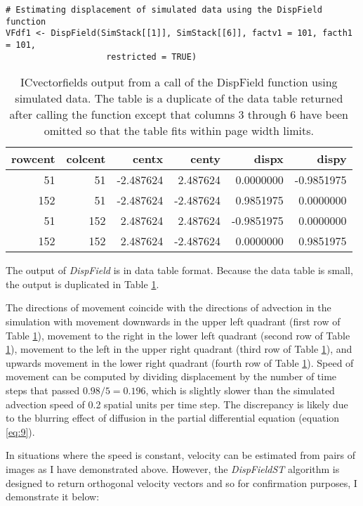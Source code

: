 \begin{verbatim}
# Estimating displacement of simulated data using the DispField function
VFdf1 <- DispField(SimStack[[1]], SimStack[[6]], factv1 = 101, facth1 = 101, 
                    restricted = TRUE)
\end{verbatim}

\begin{table}

\caption{\label{tab:DispField-output-tex}ICvectorfields output from a call of the DispField function using simulated data. The table is a duplicate of the data table returned after calling the function except that columns 3 through 6 have been omitted so that the table fits within page width limits.}
\centering
\begin{tabular}[t]{r|r|r|r|r|r}
\hline
rowcent & colcent & centx & centy & dispx & dispy\\
\hline
51 & 51 & -2.487624 & 2.487624 & 0.0000000 & -0.9851975\\
\hline
152 & 51 & -2.487624 & -2.487624 & 0.9851975 & 0.0000000\\
\hline
51 & 152 & 2.487624 & 2.487624 & -0.9851975 & 0.0000000\\
\hline
152 & 152 & 2.487624 & -2.487624 & 0.0000000 & 0.9851975\\
\hline
\end{tabular}
\end{table}

The output of \emph{DispField} is in data table format. Because the data table is small, the output is duplicated in Table \ref{tab:DispField-output-tex}.

The directions of movement coincide with the directions of advection in the simulation with movement downwards in the upper left quadrant (first row of Table \ref{tab:DispField-output-tex}), movement to the right in the lower left quadrant (second row of Table \ref{tab:DispField-output-tex}), movement to the left in the upper right quadrant (third row of Table \ref{tab:DispField-output-tex}), and upwards movement in the lower right quadrant (fourth row of Table \ref{tab:DispField-output-tex}). Speed of movement can be computed by dividing displacement by the number of time steps that passed \(0.98/5 = 0.196\), which is slightly slower than the simulated advection speed of 0.2 spatial units per time step. The discrepancy is likely due to the blurring effect of diffusion in the partial differential equation (equation \eqref{eq:9}).

In situations where the speed is constant, velocity can be estimated from pairs of images as I have demonstrated above. However, the \emph{DispFieldST} algorithm is designed to return orthogonal velocity vectors and so for confirmation purposes, I demonstrate it below:

